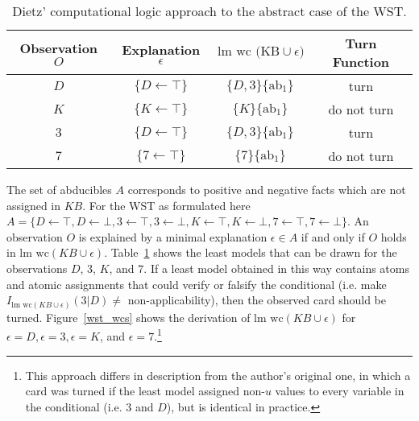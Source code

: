 \begin{table}
\begin{center}


\begin{tabular}{ c c c c }
  \textbf{Observation $O$}&  \textbf{Explanation $\epsilon$}&\textbf{$\text{lm wc (KB}\cup \epsilon)$}& \textbf{Turn Function} \\ 
  \hline
 $D$ & $\{D\leftarrow \top\}$ & $\{D,3\}\{\text{ab}_1\}$&turn\\  
 $K$ & $\{K\leftarrow \top\}$ & $\{K\}\{\text{ab}_1\}$&do not turn\\  
 $3$ & $\{D\leftarrow\top\}$ &$\{D,3\}\{\text{ab}_1\}$&turn\\
 $7$ & $\{7 \leftarrow \top\}$ & $\{7\}\{\text{ab}_1\}$&do not turn
\end{tabular}
\caption{Dietz' computational logic approach to the abstract case of the WST.}
\label{tbl:wst_lmwc}
\end{center}
\end{table}

The set of abducibles $A$ corresponds to positive and negative facts which are not assigned in $KB$. For the WST as formulated here $A=\{D\leftarrow \top,D\leftarrow \bot,3\leftarrow \top,3\leftarrow \bot,K\leftarrow \top,K\leftarrow \bot,7\leftarrow \top,7\leftarrow \bot\}$.
 An observation $O$ is explained by a minimal explanation $\epsilon \in A$ if and only if $O$ holds in $\textrm{lm wc}(KB\cup\epsilon)$. Table~\ref{tbl:wst_lmwc} shows the least models that can be drawn for the observations $D$, $3$, $K$, and $7$. If a least model obtained in this way contains atoms and atomic assignments that could verify or falsify the conditional (i.e. make $I_{\textrm{lm wc}(KB\cup \epsilon)}(3|D)\neq$ non-applicability), then the observed card should be turned. Figure~\ref{wst_wcs} shows the derivation of $\textrm{lm wc}(KB\cup \epsilon)$ for $\epsilon=D, \epsilon=3, \epsilon=K$, and $\epsilon=7$.\footnote{This approach differs in description from the author's original one, in which a card was turned if the least model assigned non-$u$ values to every variable in the conditional (i.e. $3$ and $D$), but is identical in practice.}


